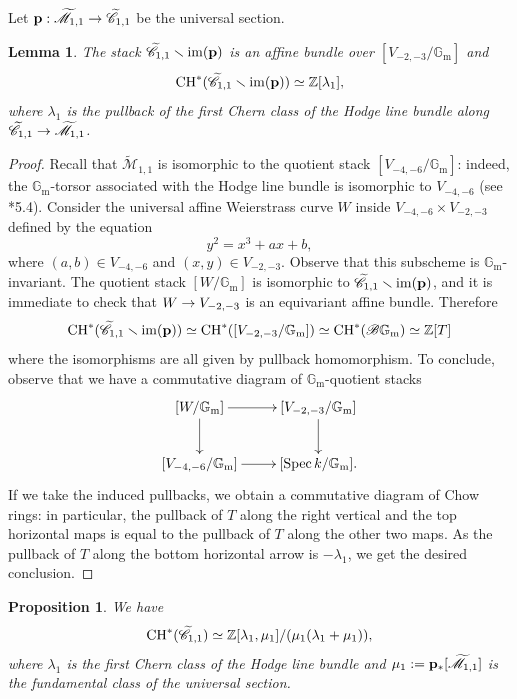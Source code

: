 \documentclass[a4paper, 10pt]{amsart}
\numberwithin{equation}{section}
\numberwithin{subsection}{section}
\newtheorem{proposition}[theorem]{Proposition}
\newtheorem{lemma}[theorem]{Lemma}
\theoremstyle{definition}
\theoremstyle{remark}
\renewcommand{\mathcal}{\mathscr}
\newcommand\GG{\mathbb{G}} \newcommand\HH{\mathbb{H}}
\newcommand\rmm{\mathrm{m}} \newcommand\rmn{\mathrm{n}}
\newcommand\arr{\ifinner\to\else\longrightarrow\fi}
\newcommand\im[1]{\operatorname{im}(#1)}
\newcommand\spec{\operatorname{Spec}}
\newcommand{\gm}{\GG_{\rmm}}
\newcommand{\Mtilde}{\widetilde{\mathcal M}}
\newcommand{\Ctilde}{\widetilde{\mathcal C}}
\newcommand{\ch}[1][*]{\operatorname{CH}^{#1}}
\begin{document}
	Let $\bfp:\Mtilde_{1,1}\to \Ctilde_{1,1}$ be the universal section.
	\begin{lemma}\label{lm:Ctilde11 minus sigma affine bundle}
		The stack $\Ctilde_{1,1}\smallsetminus\im{\bfp}$ is an affine bundle over $[V_{-2,-3}/\gm]$ and
		\[\ch(\Ctilde_{1,1}\smallsetminus\im{\bfp})\simeq \ZZ[\lambda_1],\]
		where $\lambda_1$ is the pullback of the first Chern class of the Hodge line bundle along $\Ctilde_{1,1}\arr\Mtilde_{1,1}$.
	\end{lemma}
	\begin{proof}
		Recall that $\Mtilde_{1,1}$ is isomorphic to the quotient stack $[V_{-4,-6}/\gm]$: indeed, the $\gm$-torsor associated with the Hodge line bundle is isomorphic to $V_{-4,-6}$ (see \cite{EG}*{5.4}). Consider the universal affine Weierstrass curve $W$ inside $V_{-4,-6}\times V_{-2,-3}$ defined by the equation
		\[ y^2=x^3+ax+b, \]
		where $(a,b)\in V_{-4,-6}$ and $(x,y)\in V_{-2,-3}$. Observe that this subscheme is $\gm$-invariant.
		The quotient stack $[W/\gm]$ is isomorphic to $\Ctilde_{1,1}\smallsetminus\im{\bfp}$, and it is immediate to check that $W\arr V_{-2,-3}$ is an equivariant affine bundle. Therefore
		\[ \ch(\Ctilde_{1,1}\smallsetminus\im{\bfp}) \simeq \ch([V_{-2,-3}/\gm]) \simeq \ch(\cB\gm) \simeq \ZZ[T] \]
		where the isomorphisms are all given by pullback homomorphism. To conclude, observe that we have a commutative diagram of $\gm$-quotient stacks
		\[ \xymatrix{
			[W/\gm] \ar[r] \ar[d] & [V_{-2,-3}/\gm] \ar[d] \\
			[V_{-4,-6}/\gm] \ar[r] & [\spec{k}/\gm].
		}  \]
		If we take the induced pullbacks, we obtain a commutative diagram of Chow rings: in particular, the pullback of $T$ along the right vertical and the top horizontal maps is equal to the pullback of $T$ along the other two maps. As the pullback of $T$ along the bottom horizontal arrow is $-\lambda_1$, we get the desired conclusion.
	\end{proof}
	\begin{proposition}\label{prop:chow Ctilde11}
		We have
		\[\ch(\Ctilde_{1,1})\simeq \ZZ[\lambda_1,\mu_1]/(\mu_1(\lambda_1+\mu_1)),\]
		where $\lambda_1$ is the first Chern class of the Hodge line bundle and $\mu_1:=\bfp_*[\Mtilde_{1,1}]$ is the fundamental class of the universal section.
	\end{proposition}
\end{document}
